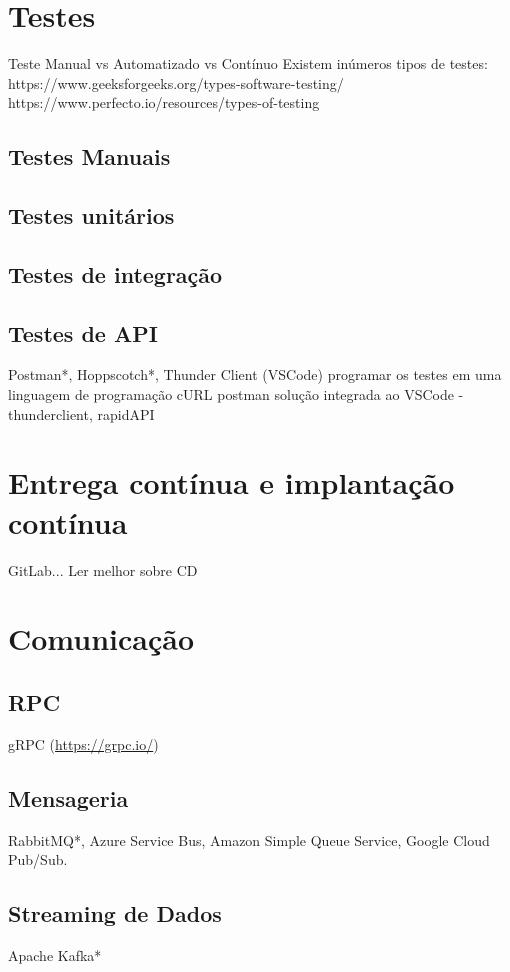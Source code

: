 \section{Testes}
Teste Manual vs Automatizado vs Contínuo
Existem inúmeros tipos de testes: 
https://www.geeksforgeeks.org/types-software-testing/
https://www.perfecto.io/resources/types-of-testing

\subsection{Testes Manuais}
\subsection{Testes unitários}
\subsection{Testes de integração}

\subsection{Testes de API}\label{ferramentas-testes-apis}
Postman*, Hoppscotch*, Thunder Client (VSCode)
programar os testes em uma linguagem de programação
cURL
postman
solução integrada ao VSCode - thunderclient, rapidAPI


\section{Entrega contínua e implantação contínua}
GitLab... Ler melhor sobre CD

\section{Comunicação}

\subsection{RPC}
gRPC (\url{https://grpc.io/})

\subsection{Mensageria}
RabbitMQ*, Azure Service Bus, Amazon Simple Queue Service, Google Cloud Pub/Sub.

\subsection{Streaming de Dados}
Apache Kafka*

